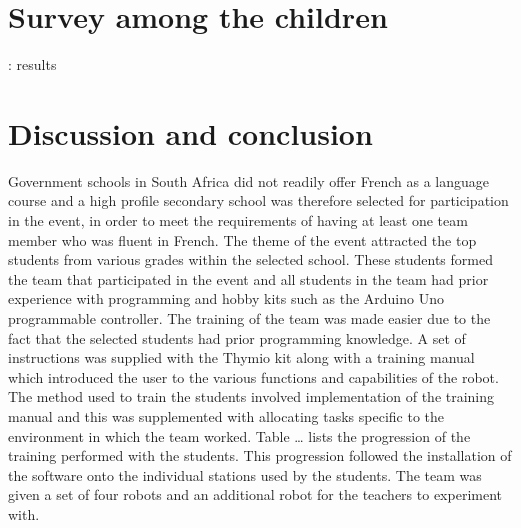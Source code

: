 \documentclass{intech-journal}
\begin{document}
\section{Survey among the children}: results



\section{Discussion and conclusion}
Government schools in South Africa did not readily offer French as a language course and a high profile secondary school was therefore selected for participation in the event, in order to meet the requirements of having at least one team member who was fluent in French. The theme of the event attracted the top students from various grades within the selected school. These students formed the team that participated in the event and all students in the team had prior experience with programming and hobby kits such as the Arduino Uno programmable controller. 
The training of the team was made easier due to the fact that the selected students had prior programming knowledge. A set of instructions was supplied with the Thymio kit along with a training manual which introduced the user to the various functions and capabilities of the robot. The method used to train the students involved implementation of the training manual and this was supplemented with allocating tasks specific to the environment in which the team worked. Table … lists the progression of the training performed with the students. This progression followed the installation of the software onto the individual stations used by the students. The team was given a set of four robots and an additional robot for the teachers to experiment with. 
\end{document}
